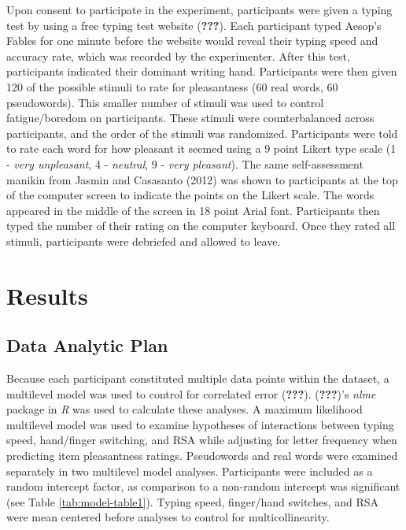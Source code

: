 \documentclass[english,man]{apa6}
\theoremstyle{definition}
\theoremstyle{definition}
\theoremstyle{definition}
\theoremstyle{remark}
\begin{document}
Upon consent to participate in the experiment, participants were given a
typing test by using a free typing test website ({\textbf{???}}). Each
participant typed Aesop's Fables for one minute before the website would
reveal their typing speed and accuracy rate, which was recorded by the
experimenter. After this test, participants indicated their dominant
writing hand. Participants were then given 120 of the possible stimuli
to rate for pleasantness (60 real words, 60 pseudowords). This smaller
number of stimuli was used to control fatigue/boredom on participants.
These stimuli were counterbalanced across participants, and the order of
the stimuli was randomized. Participants were told to rate each word for
how pleasant it seemed using a 9 point Likert type scale (1 - \emph{very
unpleasant}, 4 - \emph{neutral}, 9 - \emph{very pleasant}). The same
self-assessment manikin from Jasmin and Casasanto (2012) was shown to
participants at the top of the computer screen to indicate the points on
the Likert scale. The words appeared in the middle of the screen in 18
point Arial font. Participants then typed the number of their rating on
the computer keyboard. Once they rated all stimuli, participants were
debriefed and allowed to leave.

\section{Results}\label{results}

\subsection{Data Analytic Plan}\label{data-analytic-plan}

Because each participant constituted multiple data points within the
dataset, a multilevel model was used to control for correlated error
({\textbf{???}}). ({\textbf{???}})'s \emph{nlme} package in \emph{R} was
used to calculate these analyses. A maximum likelihood multilevel model
was used to examine hypotheses of interactions between typing speed,
hand/finger switching, and RSA while adjusting for letter frequency when
predicting item pleasantness ratings. Pseudowords and real words were
examined separately in two multilevel model analyses. Participants were
included as a random intercept factor, as comparison to a non-random
intercept was significant (see Table \ref{tab:model-table1}). Typing
speed, finger/hand switches, and RSA were mean centered before analyses
to control for multicollinearity.
\end{document}
